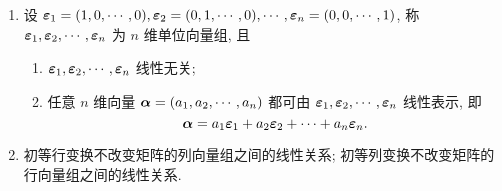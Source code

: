 \begin{enumerate}[label=(\arabic{*})]
    \item 设 $ \vb*{\varepsilon}_{1}=(1,0, \cdots, 0), \vb*{\varepsilon}_{2}=(0,1, \cdots, 0), \cdots, \vb*{\varepsilon}_{n}=(0,0, \cdots, 1) $, 称 $ \vb*{\varepsilon}_{1}, \vb*{\varepsilon}_{2}, \cdots, \vb*{\varepsilon}_{n} $ 为 $ n $ 维单位向量组, 且
          \begin{enumerate}
              \item $\vb*{\varepsilon}_{1}, \vb*{\varepsilon}_{2}, \cdots, \vb*{\varepsilon}_{n} $ 线性无关;
              \item 任意 $ n $ 维向量 $ \vb*{\alpha}=\left(a_{1}, a_{2}, \cdots, a_{n}\right) $ 都可由 $ \vb*{\varepsilon}_{1}, \vb*{\varepsilon}_{2}, \cdots, \vb*{\varepsilon}_{n} $ 线性表示, 即
                    $$\vb*{\alpha}=a_{1} \vb*{\varepsilon}_{1}+a_{2} \vb*{\varepsilon}_{2}+\cdots+a_{n} \vb*{\varepsilon}_{n}.$$
          \end{enumerate}
    \item 初等行变换不改变矩阵的列向量组之间的线性关系; 初等列变换不改变矩阵的行向量组之间的线性关系.
\end{enumerate}
